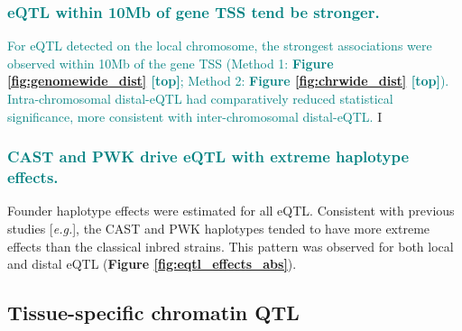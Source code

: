 \documentclass[9pt,twocolumn,twoside]{gsajnl}
\newcommand{\eg}{\emph{e.g.}\xspace}
\newcommand{\WV}[2]{\textcolor{red}{#1\footnote{\textcolor{red}{WV: #2}}}}
\newcommand{\GKinline}[1]{\textcolor{teal}{#1}}
\begin{document}
\subsubsection{\GKinline{eQTL within 10Mb of gene TSS tend be stronger.}}
\GKinline{For eQTL detected on the local chromosome, the strongest associations were observed within 10Mb of the gene TSS (Method 1: \textbf{Figure \ref{fig:genomewide_dist} [top]}; Method 2: \textbf{Figure \ref{fig:chrwide_dist} [top]}). Intra-chromosomal distal-eQTL had comparatively reduced statistical significance, more consistent with inter-chromosomal distal-eQTL.}
I%

\subsubsection{\GKinline{CAST and PWK drive eQTL with extreme haplotype effects.}}
Founder haplotype effects were estimated for all eQTL. Consistent with previous studies [\eg \citet{Aylor2011}], the CAST and PWK haplotypes tended to have more extreme effects than the classical inbred strains. This pattern was observed for both local and distal eQTL (\textbf{Figure \ref{fig:eqtl_effects_abs}}).

\subsection{Tissue-specific chromatin QTL}
\end{document}
